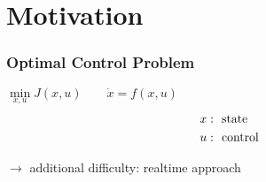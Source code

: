 \section{Motivation}
\begin{frame}
	\frametitle{Optimal Control Problem}
	\begin{block}{}
	  \centering
		\( \min \limits_{x,u} J(x,u) \qquad \dot{x} = f(x,u) \)
		\begin{align*}
		x: & \textup{ \ state} \\
		u: & \textup{ \ control} 
		\end{align*}
		\end{block}
	\vspace{1ex}
	 \( \rightarrow \) additional difficulty: realtime approach
\end{frame}